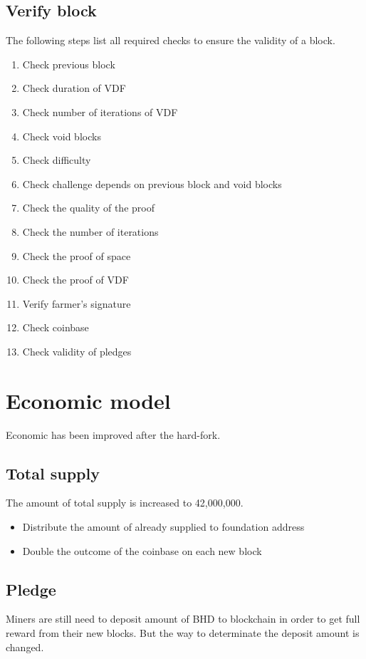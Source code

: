 \subsection{Verify block}
\begin{flushleft}
    The following steps list all required checks to ensure the validity of a block.
\end{flushleft}
\begin{enumerate}
    \item Check previous block
    \item Check duration of VDF
    \item Check number of iterations of VDF
    \item Check void blocks
    \item Check difficulty
    \item Check challenge depends on previous block and void blocks
    \item Check the quality of the proof
    \item Check the number of iterations
    \item Check the proof of space
    \item Check the proof of VDF
    \item Verify farmer's signature
    \item Check coinbase
    \item Check validity of pledges
\end{enumerate}
\section{Economic model}
\begin{flushleft}
    Economic has been improved after the hard-fork.
\end{flushleft}
\subsection{Total supply}
\begin{flushleft}
    The amount of total supply is increased to 42,000,000.
\end{flushleft}
\begin{itemize}
    \item Distribute the amount of already supplied to foundation address
    \item Double the outcome of the coinbase on each new block
\end{itemize}
\subsection{Pledge}
\begin{flushleft}
    Miners are still need to deposit amount of BHD to blockchain in order to get full reward from their new blocks. But the way to determinate the deposit amount is changed.
\end{flushleft}
